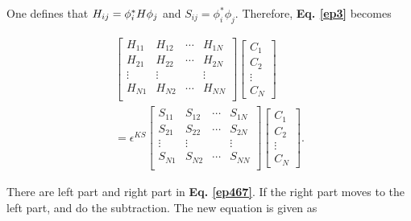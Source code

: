 \documentclass[a4paper, 12pt, titlepage,oneside,drop]{kthesis}
\begin{document}
One defines that $H_{ij} = \phi^*_i {H} \phi_j$ and $S_{ij} = \phi^*_i \phi_j$. Therefore, \textbf{Eq. \ref{ep3}} becomes

\begin{equation}\begin{split}\label{ep467}
\left[
\begin{matrix}
    H_{11} & H_{12} & \cdots & H_{1N} \\
    H_{21} & H_{22} & \cdots & H_{2N} \\
    \vdots               & \vdots               &        & \vdots               \\
     H_{N1} & H_{N2} & \cdots & H_{NN} \\
\end{matrix} \right] \left[ \begin{array}{c} C_1 \\ C_2 \\ \vdots \\ C_N\end{array} \right] \\
= \epsilon^{KS} \left[
\begin{matrix}
    S_{11} & S_{12} & \cdots & S_{1N} \\
    S_{21} & S_{22} & \cdots & S_{2N} \\
    \vdots               & \vdots               &        & \vdots               \\
     S_{N1} & S_{N2} & \cdots & S_{NN} \\
\end{matrix} \right]\left[ \begin{array}{c} C_1 \\ C_2 \\ \vdots \\ C_N\end{array} \right].
\end{split}\end{equation}

There are left part and right part in \textbf{Eq. \ref{ep467}}. If the right part moves to the left part, and do the subtraction. The new equation is given as 
\end{document}

